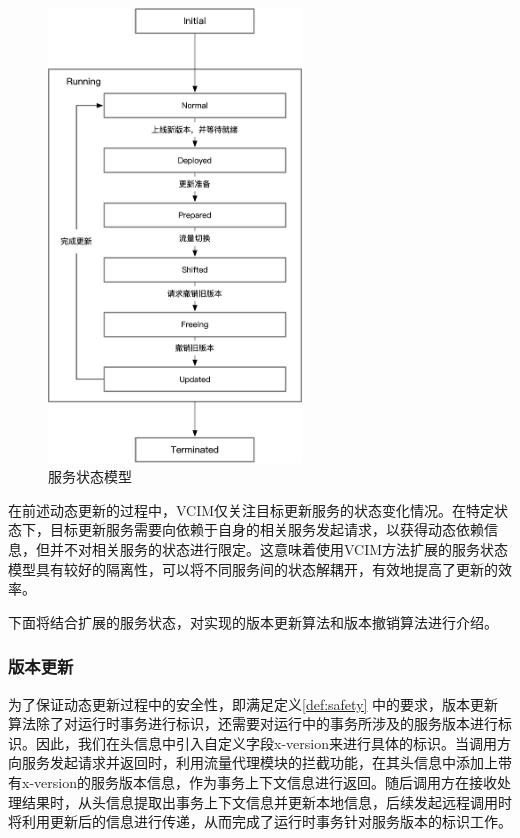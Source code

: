 \documentclass[macfonts,master]{njuthesis}
\begin{document}
\begin{figure}[!htbp]
  \centering
  \includegraphics[width= 0.6\textwidth]{image/svc_lifecycle.png}
  \caption{服务状态模型}
  \label{fig:svc_lifecycle}
\end{figure}

在前述动态更新的过程中，VCIM仅关注目标更新服务的状态变化情况。在特定状态下，目标更新服务需要向依赖于自身的相关服务发起请求，以获得动态依赖信息，但并不对相关服务的状态进行限定。这意味着使用VCIM方法扩展的服务状态模型具有较好的隔离性，可以将不同服务间的状态解耦开，有效地提高了更新的效率。

下面将结合扩展的服务状态，对实现的版本更新算法和版本撤销算法进行介绍。

\subsubsection{版本更新}
为了保证动态更新过程中的安全性，即满足定义\ref{def:safety} 中的要求，版本更新算法除了对运行时事务进行标识，还需要对运行中的事务所涉及的服务版本进行标识。因此，我们在头信息中引入自定义字段x-version来进行具体的标识。当调用方向服务发起请求并返回时，利用流量代理模块的拦截功能，在其头信息中添加上带有x-version的服务版本信息，作为事务上下文信息进行返回。随后调用方在接收处理结果时，从头信息提取出事务上下文信息并更新本地信息，后续发起远程调用时将利用更新后的信息进行传递，从而完成了运行时事务针对服务版本的标识工作。
\end{document}
